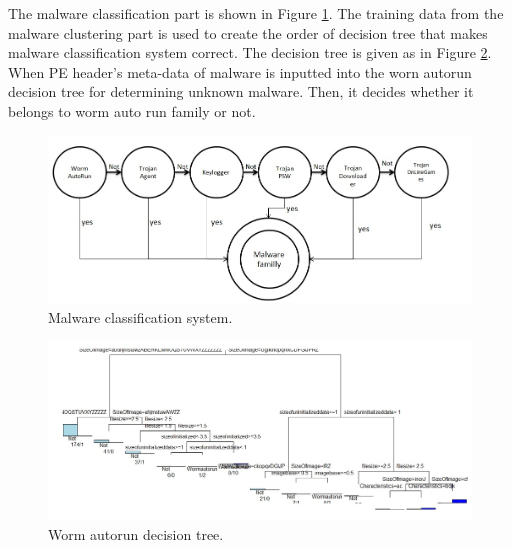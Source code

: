 The malware classification part is shown in Figure \ref{fig:classification}. The training data from the malware clustering part is used to create the order of decision tree that makes malware classification system correct.
The decision tree is given as in Figure \ref{fig:decisiontreeworm}. When PE header's meta-data of malware is inputted into the worn autorun decision tree for determining unknown malware. Then, it decides whether it belongs to worm auto run family or not.
\begin{figure}[h!]
\centering
\includegraphics[width=1\textwidth]{graph/classification.jpg}
\caption{Malware classification system.}
\label{fig:classification}
\end{figure}
\begin{figure}[h!]
\centering
\includegraphics[width=1\textwidth]{graph/decisiontreeworm.jpg}
\caption{Worm autorun decision tree.}
\label{fig:decisiontreeworm}
\end{figure}
